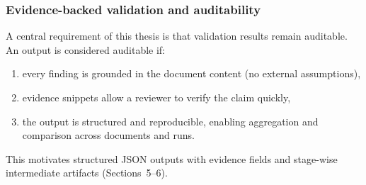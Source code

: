\subsubsection{Evidence-backed validation and auditability}
A central requirement of this thesis is that validation results remain auditable. An output is considered auditable if:
\begin{enumerate}
    \item every finding is grounded in the document content (no external assumptions),
    \item evidence snippets allow a reviewer to verify the claim quickly,
    \item the output is structured and reproducible, enabling aggregation and comparison across documents and runs.
\end{enumerate}

This motivates structured JSON outputs with evidence fields and stage-wise intermediate artifacts (Sections~5--6).